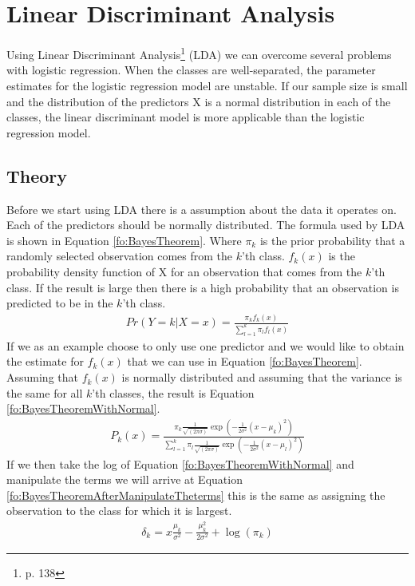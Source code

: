 \section{Linear Discriminant Analysis}
Using Linear Discriminant Analysis\footnote{\cite{James2013} p. 138} (LDA) we can overcome several problems with logistic regression. When the classes are well-separated, the parameter estimates for the logistic regression model are unstable. If our sample size is small and the distribution of the predictors X is a normal distribution in each of the classes, the linear discriminant model is more applicable than the logistic regression model.
\subsection{Theory}
Before we start using LDA there is a  assumption about the data it operates on. Each of the predictors should be normally distributed. The formula used by LDA is shown in Equation \ref{fo:BayesTheorem}. Where $\pi_k$ is the prior probability that a randomly selected observation comes from the $k$'th class. $f_k(x)$ is the probability density function of X for an observation that comes from the $k$'th class. If the result is large then there is a high probability that an observation is predicted to be in the $k$'th class.
\begin{align}\label{fo:BayesTheorem}
Pr(Y=k|X=x) = \frac{\pi_k f_k(x)}{ \sum_{l=1}^{k}\pi_l f_l(x) }
\end{align}
If we as an example choose to only use one predictor and we would like to obtain the estimate for $f_k(x)$ that we can use in Equation \ref{fo:BayesTheorem}. Assuming that $f_k(x)$ is normally distributed and assuming that the variance is the same for all $k$'th classes, the result is Equation \ref{fo:BayesTheoremWithNormal}.
\begin{align}\label{fo:BayesTheoremWithNormal}
P_k(x) = \frac{\pi_k \frac{1}{\sqrt{(2\pi\sigma)}}\exp(-\frac{1}{2\sigma^2}(x-\mu_k)^2)}{\sum_{l=1}^{k}\pi_l \frac{1}{\sqrt{(2\pi\sigma)}}\exp(-\frac{1}{2\sigma^2}(x-\mu_l)^2) }
\end{align}
If we then take the log of Equation \ref{fo:BayesTheoremWithNormal} and manipulate the terms we will arrive at Equation \ref{fo:BayesTheoremAfterManipulateTheterms} this is the same as assigning the observation to the class for which it is largest.
\begin{align}\label{fo:BayesTheoremAfterManipulateTheterms}
\delta_k = x\frac{\mu_k}{\sigma^2} - \frac{\mu^2_k}{2 \sigma^2} + \log(\pi_k)
\end{align}

